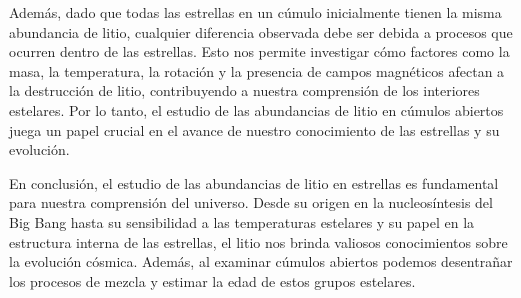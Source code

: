 Además, dado que todas las estrellas en un cúmulo inicialmente tienen la misma abundancia de litio, cualquier diferencia observada debe ser debida a procesos que ocurren dentro de las estrellas. Esto nos permite investigar cómo factores como la masa, la temperatura, la rotación y la presencia de campos magnéticos afectan a la destrucción de litio, contribuyendo a nuestra comprensión de los interiores estelares. Por lo tanto, el estudio de las abundancias de litio en cúmulos abiertos juega un papel crucial en el avance de nuestro conocimiento de las estrellas y su evolución.\par

En conclusión, el estudio de las abundancias de litio en estrellas es fundamental para nuestra comprensión del universo. Desde su origen en la nucleosíntesis del Big Bang hasta su sensibilidad a las temperaturas estelares y su papel en la estructura interna de las estrellas, el litio nos brinda valiosos conocimientos sobre la evolución cósmica. Además, al examinar cúmulos abiertos podemos desentrañar los procesos de mezcla y estimar la edad de estos grupos estelares.\par

\endinput

